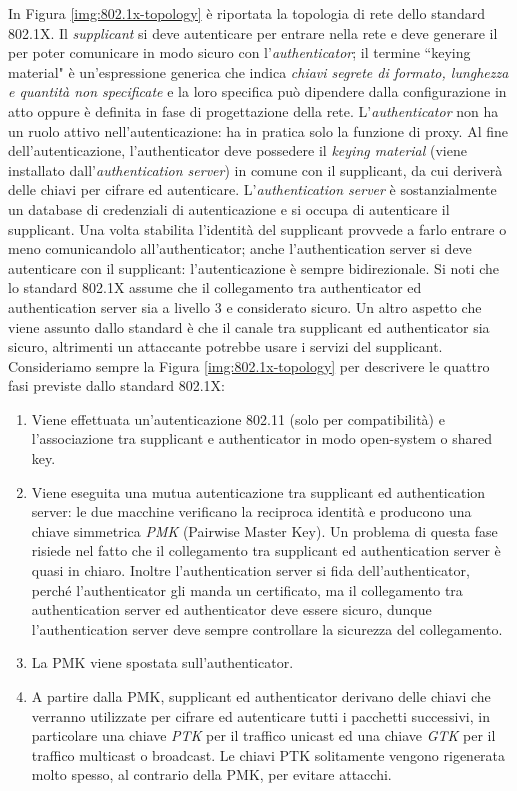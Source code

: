 In Figura \ref{img:802.1x-topology} è riportata la topologia di rete dello standard 802.1X. Il \textit{supplicant} si deve autenticare per entrare nella rete e deve generare il  per poter comunicare in modo sicuro con l'\textit{authenticator}; il termine \textquotedblleft keying material" è un'espressione generica che indica \textit{chiavi segrete di formato, lunghezza e quantità non specificate} e la loro specifica può dipendere dalla configurazione in atto oppure è definita in fase di progettazione della rete. L'\textit{authenticator} non ha un ruolo attivo nell'autenticazione: ha in pratica solo la funzione di proxy. Al fine dell'autenticazione, l'authenticator deve possedere il \textit{keying material} (viene installato dall'\textit{authentication server}) in comune con il supplicant, da cui deriverà delle chiavi per cifrare ed autenticare. L'\textit{authentication server} è sostanzialmente un database di credenziali di autenticazione e si occupa di autenticare il supplicant. Una volta stabilita l'identità del supplicant provvede a farlo entrare o meno comunicandolo all'authenticator; anche l'authentication server si deve autenticare con il supplicant: l'autenticazione è sempre bidirezionale. Si noti che lo standard 802.1X assume che il collegamento tra authenticator ed authentication server sia a livello 3 e considerato sicuro. Un altro aspetto che viene assunto dallo standard è che il canale tra supplicant ed authenticator sia sicuro, altrimenti un attaccante potrebbe usare i servizi del supplicant.\\
Consideriamo sempre la Figura \ref{img:802.1x-topology} per descrivere le quattro fasi previste dallo standard 802.1X:
\begin{enumerate}
	\item Viene effettuata un'autenticazione 802.11 (solo per compatibilità) e l'associazione tra supplicant e authenticator in modo open-system o shared key.
	\item Viene eseguita una mutua autenticazione tra supplicant ed authentication server: le due macchine verificano la reciproca identità e producono una chiave simmetrica \textit{PMK} (Pairwise Master Key). Un problema di questa fase risiede nel fatto che il collegamento tra supplicant ed authentication server è quasi in chiaro. Inoltre l'authentication server si fida dell'authenticator, perché l'authenticator gli manda un certificato, ma il collegamento tra authentication server ed authenticator deve essere sicuro, dunque l'authentication server deve sempre controllare la sicurezza del collegamento.
	\item La PMK viene spostata sull'authenticator.
	\item A partire dalla PMK, supplicant ed authenticator derivano delle chiavi che verranno utilizzate per cifrare ed autenticare tutti i pacchetti successivi, in particolare una chiave \textit{PTK} per il traffico unicast ed una chiave \textit{GTK} per il traffico multicast o broadcast. Le chiavi PTK solitamente vengono rigenerata molto spesso, al contrario della PMK, per evitare attacchi.
\end{enumerate}
